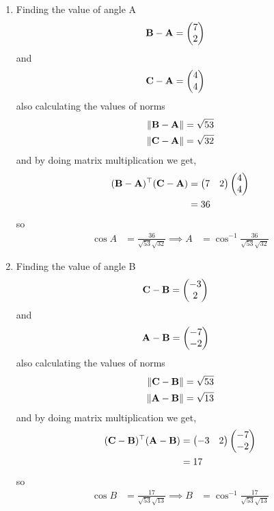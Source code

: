 \documentclass[11pt]{book}
\begin{document}
\begin{enumerate}[label=\thesection.\arabic*.,ref=\thesection.\theenumi]
\begin{enumerate}
\item Finding the value of angle A
\begin{align}
	\mathbf{B}-\mathbf{A} &=\begin{pmatrix}7\\2\end{pmatrix}
\end{align}
and 
\begin{align}
	\mathbf{C}-\mathbf{A}&= \begin{pmatrix}4\\4\end{pmatrix}
\end{align}
also calculating the values of norms
\begin{align}
	\left\lVert\mathbf{B}-\mathbf{A}\right\rVert &= \sqrt{53} \\
	\left\lVert\mathbf{C}-\mathbf{A}\right\rVert &= \sqrt{32} 
\end{align}
and by doing matrix multiplication we get,
\begin{align}
\begin{split}
	(\mathbf{B}-\mathbf{A})^{\top}(\mathbf{C}-\mathbf{A})&=\begin{pmatrix}7&2\end{pmatrix}\begin{pmatrix}4\\4\end{pmatrix}\\
	&=36
\end{split}
\end{align}
so 
\begin{align}
	\cos{A}&= \frac{36}{\sqrt{53} \sqrt{32}}
	\implies A&=\cos^{-1}{ \frac{36}{\sqrt{53} \sqrt{32}}}
\end{align}




\item Finding the value of angle B
\begin{align}
	\mathbf{C}-\mathbf{B} &=\begin{pmatrix}-3\\2\end{pmatrix}
\end{align}
and 
\begin{align}
	\mathbf{A}-\mathbf{B}&= \begin{pmatrix}-7\\-2\end{pmatrix}
\end{align}
also calculating the values of norms
\begin{align}
	\left\lVert\mathbf{C}-\mathbf{B}\right\rVert &= \sqrt{53}\\
	\left\lVert\mathbf{A}-\mathbf{B}\right\rVert &= \sqrt{13}
\end{align}
and by doing matrix multiplication we get,
\begin{align}
\begin{split}
	(\mathbf{C}-\mathbf{B})^{\top}(\mathbf{A}-\mathbf{B})&=\begin{pmatrix}-3&2\end{pmatrix}\begin{pmatrix}-7\\-2\end{pmatrix}\\
	&= 17
\end{split}
\end{align}
so 
\begin{align}
	\cos{B}&= \frac{17}{\sqrt{53} \sqrt{13}}
	\implies B&=\cos^{-1}{ \frac{17}{\sqrt{53} \sqrt{13}}}
\end{align}




\end{enumerate}
\end{enumerate}
\end{document}
